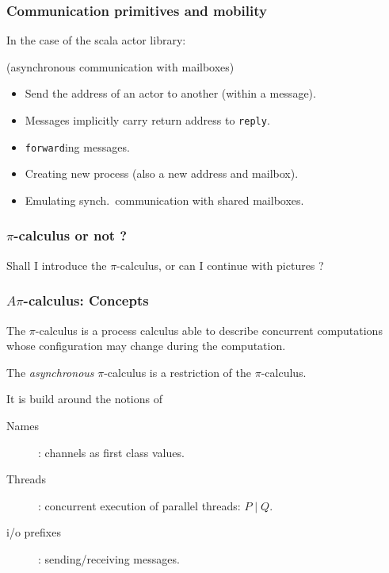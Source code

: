 \documentclass{beamer}
\begin{document}
\begin{frame}
  \frametitle{Communication primitives and mobility}

  In the case of the scala actor library:
  
  (asynchronous communication with mailboxes)

  \begin{itemize}
    \item Send the address of an actor to another (within a message).
    \item Messages implicitly carry return address to \texttt{reply}.
    \item \texttt{forward}ing messages.
    \item Creating new process (also a new address and mailbox).
    \item Emulating synch.~communication with shared mailboxes.
  \end{itemize}


\end{frame}

\begin{frame}
  \frametitle{$\pi$-calculus or not ?}

   Shall I introduce the $\pi$-calculus, or can I continue with pictures ?

\end{frame}

\begin{frame}
\frametitle{$A\pi$-calculus: Concepts}

The $\pi$-calculus \cite{DBLP:journals/iandc/MilnerPW92a,DBLP:journals/iandc/MilnerPW92b} is a process calculus able to describe concurrent computations whose configuration may change during the computation.

The \textit{asynchronous} $\pi$-calculus \cite{DBLP:conf/ecoop/HondaT91} is a restriction of the $\pi$-calculus.

\vspace{5pt}
It is build around the notions of 
\begin{description}
\item[Names]: channels as first class values. %
\item[Threads]: concurrent execution of parallel threads: $P\;|\;Q$.
\item[i/o prefixes]: sending/receiving messages.
\end{description}
\end{frame}
\end{document}
